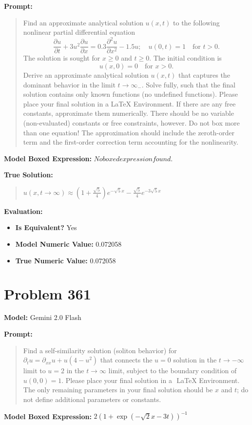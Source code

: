 \documentclass{article}
\begin{document}
{\textbf{Prompt:}
\begin{quote}
Find an approximate analytical solution $u(x, t)$ to the following nonlinear partial differential equation $$\frac{\partial u}{\partial t} + 3u^2 \frac{\partial u}{\partial x} = 0.3 \frac{\partial^2 u}{\partial x^2} - 1.5 u; \quad u(0, t) = 1 \quad \text{for } t > 0.$$ The solution is sought for $x \ge 0$ and $t \ge 0$. The initial condition is $$u(x, 0) = 0 \quad \text{for } x > 0.$$ Derive an approximate analytical solution $u(x, t)$ that captures the dominant behavior in the limit $t \rightarrow \infty_-$. Solve fully, such that the final solution contains only known functions (no undefined functions). Please place your final solution in a \boxed{} LaTeX Environment. If there are any free constants, approximate them numerically. There should be no variable (non-evaluated) constants or free constraints, however. Do not box more than one equation! The approximation should include the zeroth-order term and the first-order correction term accounting for the nonlinearity.
\end{quote}
\textbf{Model Boxed Expression:} $No boxed expression found.$

\textbf{True Solution:}
\begin{quote}
$u(x, t \rightarrow \infty) \approx \left(1 + \frac{\sqrt{5}}{4}\right) e^{-\sqrt{5}x} - \frac{\sqrt{5}}{4} e^{-3\sqrt{5}x}$
\end{quote}

\textbf{Evaluation:}
\begin{itemize}
\item \textbf{Is Equivalent?} Yes
\item \textbf{Model Numeric Value:} 0.072058
\item \textbf{True Numeric Value:} 0.072058
\end{itemize}
\vspace{1cm}
\section*{Problem 361}
\textbf{Model:} Gemini 2.0 Flash

\textbf{Prompt:}
\begin{quote}
Find a self-similarity solution (soliton behavior) for $\partial_t u = \partial_{xx} u + u (4 - u^2)$ that connects the $u = 0$ solution in the $t \rightarrow -\infty$ limit to $u = 2$ in the $t \rightarrow \infty$ limit, subject to the boundary condition of $u(0, 0) = 1$. Please place your final solution in a $\boxed{}$ LaTeX Environment. The only remaining parameters in your final solution should be $x$ and $t$; do not define additional parameters or constants.
\end{quote}
\textbf{Model Boxed Expression:} $2 \left(1 + \exp\left(-\sqrt{2} x - 3t\right)\right)^{-1}$

}
\end{document}
